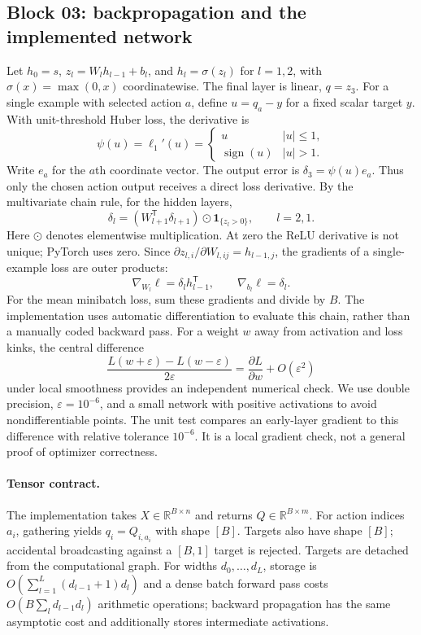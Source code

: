 \documentclass[11pt,a4paper]{article}
\newcommand{\R}{\mathbb R}
\newcommand{\one}{\mathbf 1}
\begin{document}
\subsection{Block 03: backpropagation and the implemented network}
Let $h_0=s$, $z_l=W_lh_{l-1}+b_l$, and $h_l=\sigma(z_l)$ for $l=1,2$, with $\sigma(x)=\max(0,x)$ coordinatewise. The final layer is linear, $q=z_3$. For a single example with selected action $a$, define $u=q_a-y$ for a fixed scalar target $y$. With unit-threshold Huber loss, the derivative is
\[
 \psi(u)=\ell_1'(u)=\begin{cases}u&|u|\le 1,\\ \operatorname{sign}(u)&|u|>1.\end{cases}
\]
Write $e_a$ for the $a$th coordinate vector. The output error is $\delta_3=\psi(u)e_a$. Thus only the chosen action output receives a direct loss derivative. By the multivariate chain rule, for the hidden layers,
\[
 \delta_l=(W_{l+1}^{\mathsf T}\delta_{l+1})\odot\one_{\{z_l>0\}},\qquad l=2,1.
\]
Here $\odot$ denotes elementwise multiplication. At zero the ReLU derivative is not unique; PyTorch uses zero. Since $\partial z_{l,i}/\partial W_{l,ij}=h_{l-1,j}$, the gradients of a single-example loss are outer products:
\[
 \nabla_{W_l}\ell=\delta_l h_{l-1}^{\mathsf T},\qquad
 \nabla_{b_l}\ell=\delta_l.
\]
For the mean minibatch loss, sum these gradients and divide by $B$. The implementation uses automatic differentiation to evaluate this chain, rather than a manually coded backward pass. For a weight $w$ away from activation and loss kinks, the central difference
\[
 \frac{L(w+\varepsilon)-L(w-\varepsilon)}{2\varepsilon}
 =\frac{\partial L}{\partial w}+O(\varepsilon^2)
\]
under local smoothness provides an independent numerical check. We use double precision, $\varepsilon=10^{-6}$, and a small network with positive activations to avoid nondifferentiable points. The unit test compares an early-layer gradient to this difference with relative tolerance $10^{-6}$. It is a local gradient check, not a general proof of optimizer correctness.

\paragraph{Tensor contract.} The implementation takes $X\in\R^{B\times n}$ and returns $Q\in\R^{B\times m}$. For action indices $a_i$, gathering yields $q_i=Q_{i,a_i}$ with shape $[B]$. Targets also have shape $[B]$; accidental broadcasting against a $[B,1]$ target is rejected. Targets are detached from the computational graph. For widths $d_0,\ldots,d_L$, storage is $O(\sum_{l=1}^L(d_{l-1}+1)d_l)$ and a dense batch forward pass costs $O(B\sum_l d_{l-1}d_l)$ arithmetic operations; backward propagation has the same asymptotic cost and additionally stores intermediate activations.
\end{document}
